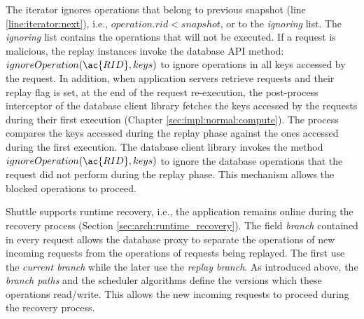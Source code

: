 The iterator ignores operations that belong to previous snapshot (line \ref{line:iterator:next}), i.e., $operation.rid < snapshot$, or to the \emph{ignoring} list. The \emph{ignoring} list contains the operations that will not be executed. If a request is malicious, the replay instances invoke the database \ac{API} method: $ignoreOperation(\ac{RID},keys)$ to ignore operations in all keys accessed by the request. In addition, when application servers retrieve requests and their replay flag is set, at the end of the request re-execution, the post-process interceptor of the database client library fetches the keys accessed by the requests during their first execution (Chapter \ref{sec:impl:normal:compute}). The process compares the keys accessed during the replay phase against the ones accessed during the first execution. The database client library invokes the method $ignoreOperation(\ac{RID},keys)$ to ignore the database operations that the request did not perform during the replay phase. This mechanism allows the blocked operations to proceed.



Shuttle supports runtime recovery, i.e., the application remains online during the recovery process (Section \ref{sec:arch:runtime_recovery}). The field \emph{branch} contained in every request allows the database proxy to separate the operations of new incoming requests from the operations of requests being replayed. The first use the \emph{current branch} while the later use the \emph{replay branch}. As introduced above, the \emph{branch paths} and the scheduler algorithms define the versions which these operations read/write. This allows the new incoming requests to proceed during the recovery process.

